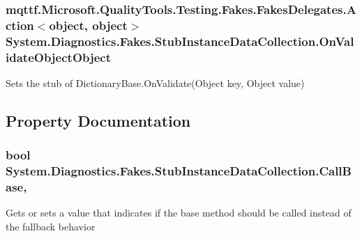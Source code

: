\hypertarget{class_system_1_1_diagnostics_1_1_fakes_1_1_stub_instance_data_collection_a3fcd173fb1d4fb0f4b09bfc4a34bb1ec}{
\subsubsection[{On\-Validate\-Object\-Object}]{\setlength{\rightskip}{0pt plus 5cm}mqttf.\-Microsoft.\-Quality\-Tools.\-Testing.\-Fakes.\-Fakes\-Delegates.\-Action$<$object, object$>$ System.\-Diagnostics.\-Fakes.\-Stub\-Instance\-Data\-Collection.\-On\-Validate\-Object\-Object}}\label{class_system_1_1_diagnostics_1_1_fakes_1_1_stub_instance_data_collection_a3fcd173fb1d4fb0f4b09bfc4a34bb1ec}


Sets the stub of Dictionary\-Base.\-On\-Validate(\-Object key, Object value)



\subsection{Property Documentation}
\hypertarget{class_system_1_1_diagnostics_1_1_fakes_1_1_stub_instance_data_collection_ae808bcdb2b63f9dfc1de33f9452c1da3}{
\subsubsection[{Call\-Base}]{\setlength{\rightskip}{0pt plus 5cm}bool System.\-Diagnostics.\-Fakes.\-Stub\-Instance\-Data\-Collection.\-Call\-Base\hspace{0.3cm}{\ttfamily [get]}, {\ttfamily [set]}}}\label{class_system_1_1_diagnostics_1_1_fakes_1_1_stub_instance_data_collection_ae808bcdb2b63f9dfc1de33f9452c1da3}


Gets or sets a value that indicates if the base method should be called instead of the fallback behavior

